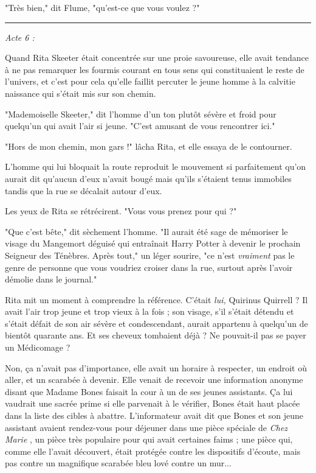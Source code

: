 "Très bien," dit Flume, "qu'est-ce que vous voulez ?"
\par\noindent\rule{\textwidth}{0.4pt}
\emph{Acte 6 :} 

Quand Rita Skeeter était concentrée sur une proie savoureuse, elle avait tendance à ne pas remarquer les fourmis courant en tous sens qui constituaient le reste de l'univers, et c'est pour cela qu'elle faillit percuter le jeune homme à la calvitie naissance qui s'était mis sur son chemin.

"Mademoiselle Skeeter," dit l'homme d'un ton plutôt sévère et froid pour quelqu'un qui avait l'air si jeune. "C'est amusant de vous rencontrer ici."

"Hors de mon chemin, mon gars !" lâcha Rita, et elle essaya de le contourner.

L'homme qui lui bloquait la route reproduit le mouvement si parfaitement qu'on aurait dit qu'aucun d'eux n'avait bougé mais qu'ils s'étaient tenus immobiles tandis que la rue se décalait autour d'eux.

Les yeux de Rita se rétrécirent. "Vous vous prenez pour qui ?"

"Que c'est bête," dit sèchement l'homme. "Il aurait été sage de mémoriser le visage du Mangemort déguisé qui entraînait Harry Potter à devenir le prochain Seigneur des Ténèbres. Après tout," un léger sourire, "ce n'est \emph{vraiment} pas le genre de personne que vous voudriez croiser dans la rue, surtout après l'avoir démolie dans le journal."

Rita mit un moment à comprendre la référence. C'était \emph{lui,} Quirinus Quirrell ? Il avait l'air trop jeune et trop vieux à la fois ; son visage, s'il s'était détendu et s'était défait de son air sévère et condescendant, aurait appartenu à quelqu'un de bientôt quarante ans. Et ses cheveux tombaient déjà ? Ne pouvait-il pas se payer un Médicomage ?

Non, ça n'avait pas d'importance, elle avait un horaire à respecter, un endroit où aller, et un scarabée à devenir. Elle venait de recevoir une information anonyme disant que Madame Bones faisait la cour à un de ses jeunes assistants. Ça lui vaudrait une sacrée prime si elle parvenait à le vérifier, Bones était haut placée dans la liste des cibles à abattre. L'informateur avait dit que Bones et son jeune assistant avaient rendez-vous pour déjeuner dans une pièce spéciale de \emph{Chez Marie} , un pièce très populaire pour qui avait certaines faims ; une pièce qui, comme elle l'avait découvert, était protégée contre les dispositifs d'écoute, mais pas contre un magnifique scarabée bleu lové contre un mur...

